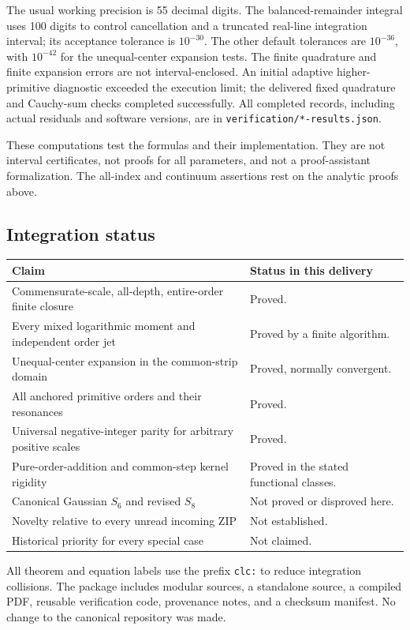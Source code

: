 The usual working precision is 55 decimal digits. The balanced-remainder
integral uses 100 digits to control cancellation and a truncated
real-line integration interval; its acceptance tolerance is $10^{-30}$.
The other default tolerances are $10^{-36}$, with $10^{-42}$ for the
unequal-center expansion tests. The finite quadrature and finite expansion
errors are not interval-enclosed. An initial adaptive higher-primitive
diagnostic exceeded the execution limit; the delivered fixed quadrature
and Cauchy-sum checks completed successfully. All completed records,
including actual residuals and software versions, are in
\texttt{verification/*-results.json}.

These computations test the formulas and their implementation. They are
not interval certificates, not proofs for all parameters, and not a
proof-assistant formalization. The all-index and continuum assertions
rest on the analytic proofs above.

\subsection{Integration status}
\begin{center}
\begin{tabular}{p{}p{}}
\toprule
Claim & Status in this delivery\\
\midrule
Commensurate-scale, all-depth, entire-order finite closure & Proved.\\
Every mixed logarithmic moment and independent order jet & Proved by a finite algorithm.\\
Unequal-center expansion in the common-strip domain & Proved, normally convergent.\\
All anchored primitive orders and their resonances & Proved.\\
Universal negative-integer parity for arbitrary positive scales & Proved.\\
Pure-order-addition and common-step kernel rigidity & Proved in the stated functional classes.\\
Canonical Gaussian $S_6$ and revised $S_8$ & Not proved or disproved here.\\
Novelty relative to every unread incoming ZIP & Not established.\\
Historical priority for every special case & Not claimed.\\
\bottomrule
\end{tabular}
\end{center}
All theorem and equation labels use the prefix \texttt{clc:} to reduce
integration collisions. The package includes modular sources, a standalone
source, a compiled PDF, reusable verification code, provenance notes,
and a checksum manifest. No change to the canonical repository was made.
